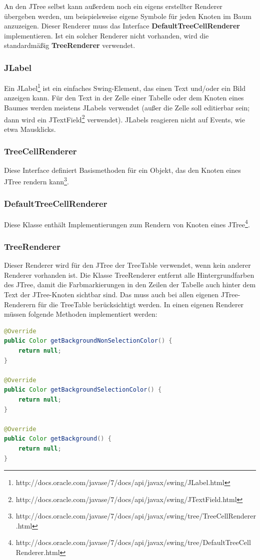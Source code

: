 An den JTree selbst kann außerdem noch ein eigens erstellter Renderer übergeben werden, um beispielsweise eigene Symbole für jeden Knoten im Baum anzuzeigen. Dieser Renderer muss das Interface \textbf{DefaultTreeCellRenderer} implementieren. Ist ein solcher Renderer nicht vorhanden, wird die standardmäßig \textbf{TreeRenderer} verwendet.

\subsubsection*{JLabel}
Ein JLabel\footnote{http://docs.oracle.com/javase/7/docs/api/javax/swing/JLabel.html} ist ein einfaches Swing-Element, das einen Text und/oder ein Bild anzeigen kann. Für den Text in der Zelle einer Tabelle oder dem Knoten eines Baumes werden meistens JLabels verwendet (außer die Zelle soll editierbar sein; dann wird ein JTextField\footnote{http://docs.oracle.com/javase/7/docs/api/javax/swing/JTextField.html} verwendet). JLabels reagieren nicht auf Events, wie etwa Mausklicks.

\subsubsection*{TreeCellRenderer}
Diese Interface definiert Basismethoden für ein Objekt, das den Knoten eines JTree rendern kann\footnote{http://docs.oracle.com/javase/7/docs/api/javax/swing/tree/TreeCellRenderer.html}.

\subsubsection*{DefaultTreeCellRenderer}
Diese Klasse enthält Implementierungen zum Rendern von Knoten eines JTree\footnote{http://docs.oracle.com/javase/7/docs/api/javax/swing/tree/DefaultTreeCellRenderer.html}.

\subsubsection*{TreeRenderer}
Dieser Renderer wird für den JTree der TreeTable verwendet, wenn kein anderer Renderer vorhanden ist. Die Klasse TreeRenderer entfernt alle Hintergrundfarben des JTree, damit die Farbmarkierungen in den Zeilen der Tabelle auch hinter dem Text der JTree-Knoten sichtbar sind. Das muss auch bei allen eigenen JTree-Renderern für die TreeTable berücksichtigt werden. In einen eigenen Renderer müssen folgende Methoden implementiert werden:
\begin{lstlisting}[language=JAVA]
@Override
public Color getBackgroundNonSelectionColor() {
    return null;
}

@Override
public Color getBackgroundSelectionColor() {
    return null;
}

@Override
public Color getBackground() {
    return null;
}
\end{lstlisting}

